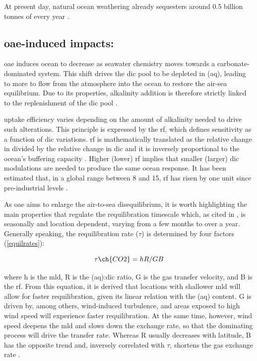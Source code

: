 At present day, natural ocean weathering already sequesters around 0.5 billion tonnes of  every year \citep{NAP26278}.

\subsection[\texorpdfstring{OAE}{OAE}-induced impacts:]{\ac{oae}-induced impacts:}

\ac{oae} induces ocean  to decrease as seawater chemistry moves towards a carbonate-dominated system. This shift drives the \ac{dic} pool to be depleted in (aq), leading to more  to flow from the atmosphere into the ocean to restore the air-sea equilibrium. Due to its properties, alkalinity addition is therefore strictly linked to the replenishment of the \ac{dic} pool \citep{he2022limits}.

 uptake efficiency varies depending on the amount of alkalinity needed to drive such alterations. This principle is expressed by the \ac{rf}, which defines  sensitivity as a function of \ac{dic} variations. \ac{rf} is mathematically translated as the relative change in  divided by the relative change in \ac{dic} \citep{devries2022ocean} and it is inversely proportional to the ocean's buffering capacity \citep{renforth2017assessing}. Higher (lower) \ac{rf} implies that smaller (larger) \ac{dic} modulations are needed to produce the same ocean  response. It has been estimated that, in a global range between 8 and 15, \ac{rf} has risen by one unit since pre-industrial levels \citep{mcneil2019changing, egleston2010revelle}.

As \ac{oae} aims to enlarge the air-to-sea  disequilibrium, it is worth highlighting the main properties that regulate the requilibration timescale which, as cited in \cite{jones2014spatial}, is seasonally and location dependent, varying from a few months to over a year. Generally speaking, the  requilibration rate ($\tau$) is determined by four factors (\ref{equilrates}): 

\begin{center}

\begin{equation} 
\label{equilrates}
\tau \ch{CO2} = hR/GB
\end{equation}

\end{center}

where h is the \ac{mld}, R is the (aq):\ac{dic} ratio, G is the gas transfer velocity, and B is the \acl{rf}. From this equation, it is derived that locations with shallower \ac{mld} will allow for faster requilibration, given its linear relation with the (aq) content. G is driven by, among others, wind-induced turbulence, and areas exposed to high wind speed will experience faster requilibration. At the same time, however, wind speed deepens the \ac{mld} and slows down the exchange rate, so that the dominating process will drive the transfer rate. Whereas R usually decreases with latitude, B has the opposite trend and, inversely correlated with $\tau$, shortens the gas exchange rate \citep{jones2014spatial}. 

